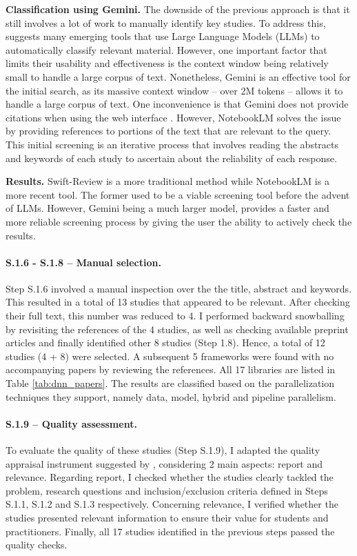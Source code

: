 \textbf{Classification using Gemini.}
The downside of the previous approach is that it still involves a lot of work to manually identify key
studies. To address this, \cite{bolanos_artificial_2024} suggests many emerging tools that use Large Language Models (LLMs)
to automatically classify relevant material. However, one important factor that limits their usability and effectiveness is the
context window being relatively small to handle a large corpus of text. Nonetheless, Gemini \cite{team_gemini_2024}
is an effective tool for the initial search, as its massive context window -- over 2M tokens -- allows it to handle a large corpus of text.
One inconvenience is that Gemini does not provide citations when using the web interface
\cite{noauthor_gemini_nodate}. However, NotebookLM \cite{notebooklm_google_2024} solves the issue by providing references
to portions of the text that are relevant to the query. This initial screening is an iterative process that involves
reading the abstracts and keywords of each study to ascertain about the reliability of each response.

\textbf{Results.}
Swift-Review is a more traditional method while NotebookLM is a more recent tool. The former used
to be a viable screening tool before the advent of LLMs. However, Gemini being a much larger model,
provides a faster and more reliable screening process by giving the user the ability to actively
check the results.

\paragraph{S.1.6 - S.1.8 -- Manual selection.}
Step S.1.6 involved a manual inspection over the the title, abstract and keywords. This resulted in
a total of 13 studies that appeared to be relevant. After checking their full text, this number was
reduced to 4. I performed backward snowballing \cite{jalali_systematic_2012} by revisiting the
references of the 4 studies, as well as checking available preprint articles and finally identified
other 8 studies (Step 1.8). Hence, a total of 12 studies (4 + 8) were selected. A subsequent 5
frameworks were found with no accompanying papers by reviewing the references. All 17 libraries are
listed in Table \ref{tab:dnn_papers}. The results are classified based on the parallelization
techniques they support, namely data, model, hybrid and pipeline parallelism.

\paragraph{S.1.9 -- Quality assessment.}
To evaluate the quality of these studies (Step S.1.9), I adapted the quality appraisal instrument
suggested by \cite{zhou_map_2016}, considering 2 main aspects: report and relevance. Regarding
report, I checked whether the studies clearly tackled the problem, research questions and
inclusion/exclusion criteria defined in Steps S.1.1, S.1.2 and S.1.3 respectively. Concerning
relevance, I verified whether the studies presented relevant information to ensure their value for
students and practitioners. Finally, all 17 studies identified in the previous steps passed the
quality checks.

